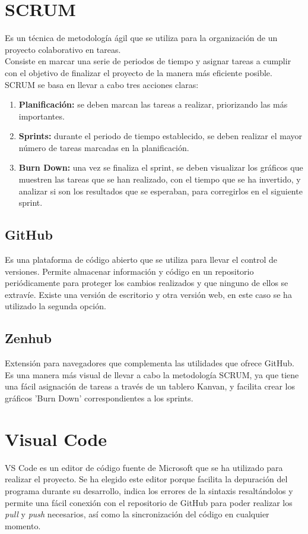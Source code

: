
\section{SCRUM}
Es un técnica de metodología ágil que se utiliza para la organización de un proyecto colaborativo en tareas.\\
Consiste en marcar una serie de periodos de tiempo y asignar tareas a cumplir con el objetivo de finalizar el proyecto de la manera más eficiente posible.
SCRUM se basa en llevar a cabo tres acciones claras:
\begin{enumerate}
    \item \textbf{Planificación:} se deben marcan las tareas a realizar, priorizando las más importantes.
    \item \textbf{Sprints:} durante el periodo de tiempo establecido, se deben realizar el mayor número de tareas marcadas en la planificación.
    \item \textbf{Burn Down:} una vez se finaliza el sprint, se deben visualizar los gráficos que muestren las tareas que se han realizado, con el tiempo que se ha invertido, y analizar si son los resultados que se esperaban, para corregirlos en el siguiente sprint.
\end{enumerate}

\subsection{GitHub}
Es una plataforma de código abierto que se utiliza para llevar el control de versiones. Permite almacenar información y código en un repositorio periódicamente para proteger los cambios realizados y que ninguno de ellos se extravíe. Existe una versión de escritorio y otra versión web, en este caso se ha utilizado la segunda opción.

\subsection{Zenhub}
Extensión para navegadores que complementa las utilidades que ofrece GitHub. Es una manera más visual de llevar a cabo la metodología SCRUM, ya que tiene una fácil asignación de tareas a través de un tablero Kanvan, y facilita crear los gráficos 'Burn Down' correspondientes a los sprints.

\section{Visual Code}
VS Code es un editor de código fuente de Microsoft que se ha utilizado para realizar el proyecto. Se ha elegido este editor porque facilita la depuración del programa durante su desarrollo, indica los errores de la sintaxis resaltándolos y permite una fácil conexión con el repositorio de GitHub para poder realizar los \textit{pull} y \textit{push} necesarios, así como la sincronización del código en cualquier momento.

